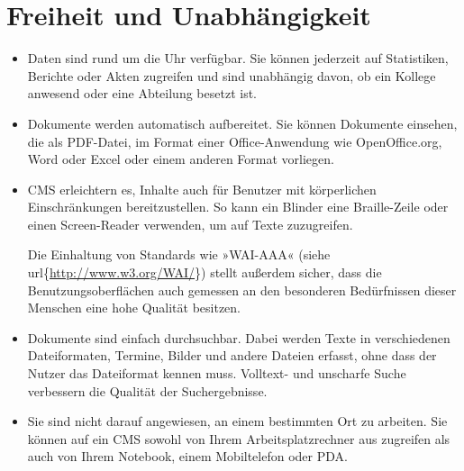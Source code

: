 \documentclass[a4paper,12pt,ngerman]{manual}
\begin{document}
\section{Freiheit und Unabhängigkeit}
\begin{itemize}
\item {} 
Daten sind rund um die Uhr verfügbar. Sie können jederzeit auf
Statistiken, Berichte oder Akten zugreifen und sind unabhängig davon, ob ein
Kollege anwesend oder eine Abteilung besetzt ist.

\item {} 
Dokumente werden automatisch aufbereitet. Sie können Dokumente einsehen,
die als PDF-Datei, im Format einer Office-Anwendung wie OpenOffice.org,
Word oder Excel oder einem anderen Format vorliegen.

\item {} 
CMS erleichtern es, Inhalte auch für Benutzer mit körperlichen
Einschränkungen bereitzustellen. So kann ein Blinder eine Braille-Zeile oder
einen Screen-Reader verwenden, um auf Texte zuzugreifen.

Die Einhaltung von Standards wie »WAI-AAA« (siehe
url\{\href{http://www.w3.org/WAI/}{http://www.w3.org/WAI/}\}) stellt außerdem sicher, dass die
Benutzungsoberflächen auch gemessen an den besonderen Bedürfnissen dieser
Menschen eine hohe Qualität besitzen.

\item {} 
Dokumente sind einfach durchsuchbar. Dabei werden Texte in verschiedenen
Dateiformaten, Termine, Bilder und andere Dateien erfasst, ohne dass der
Nutzer das Dateiformat kennen muss. Volltext- und unscharfe Suche
verbessern die Qualität der Suchergebnisse.

\item {} 
Sie sind nicht darauf angewiesen, an einem bestimmten Ort zu
arbeiten. Sie können auf ein CMS sowohl von Ihrem Arbeitsplatzrechner aus
zugreifen als auch von Ihrem Notebook, einem Mobiltelefon oder PDA.

\end{itemize}
\end{document}

